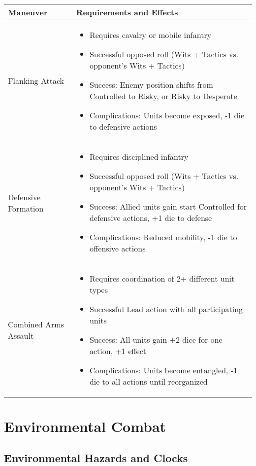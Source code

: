 \begin{longtable}{|>{\raggedright\arraybackslash}p{4cm}|>{\raggedright\arraybackslash}p{8cm}|}
\hline
\textbf{Maneuver} & \textbf{Requirements and Effects} \\
\hline
Flanking Attack & 
\begin{itemize}
    \item Requires cavalry or mobile infantry
    \item Successful opposed roll (Wits + Tactics vs. opponent's Wits + Tactics)
    \item Success: Enemy position shifts from Controlled to Risky, or Risky to Desperate
    \item Complications: Units become exposed, -1 die to defensive actions
\end{itemize} \\
\hline
Defensive Formation & 
\begin{itemize}
    \item Requires disciplined infantry
    \item Successful opposed roll (Wits + Tactics vs. opponent's Wits + Tactics)
    \item Success: Allied units gain start Controlled for defensive actions, +1 die to defense
    \item Complications: Reduced mobility, -1 die to offensive actions
\end{itemize} \\
\hline
Combined Arms Assault & 
\begin{itemize}
    \item Requires coordination of 2+ different unit types
    \item Successful Lead action with all participating units
    \item Success: All units gain +2 dice for one action, +1 effect
    \item Complications: Units become entangled, -1 die to all actions until reorganized
\end{itemize} \\
\hline
\end{longtable}

\newpage

\section{Environmental Combat}

\subsection{Environmental Hazards and Clocks}

